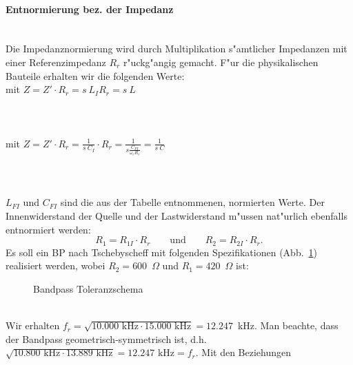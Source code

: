 \paragraph{Entnormierung bez. der Impedanz}~\\
Die Impedanznormierung wird durch Multiplikation s"amtlicher Impedanzen mit
einer Referenzimpedanz $R_r$ r"uckg"angig gemacht.
F"ur die physikalischen Bauteile erhalten wir die folgenden Werte:\\
\nit mit  $ Z=Z' \cdot R_r=s~ L_I R_r=s~ L $\\~~\\
\\~~\\
\nit mit $ Z=Z' \cdot R_r=\displaystyle\frac{1}{s~C_I} \cdot R_r  =
\displaystyle\frac{1}{s \displaystyle\frac{C_{FI}}{\omega_r R_r}}=
\displaystyle\frac{1}{s~C} $\\~~\\
\\~~\\ 
$L_{FI}$ und $C_{FI}$ sind die aus der Tabelle entnommenen,
normierten Werte.  Der Innenwiderstand der
Quelle und der Lastwiderstand
m"ussen nat"urlich ebenfalls entnormiert werden:
\begin{equation*}
R_1=R_{1I} \cdot R_r\qquad\text{und}\qquad R_2=R_{2I} \cdot R_r.
\end{equation*}
\bsp{}
Es soll ein BP nach Tschebyscheff mit folgenden Spezifikationen (Abb.~\ref{FIL_BP_BSP}) realisiert
werden, wobei $R_2=600$~$\Omega$ und $R_1=420$~$\Omega$ ist:
\begin{figure}[!htb]
\vspace*{-3mm}
\begin{center}
  \caption{Bandpass Toleranzschema}\label{FIL_BP_BSP}
\end{center}
\vspace*{-6mm}
\end{figure}\\
\nit Wir erhalten $f_r=\sqrt{10.000\mbox{~kHz}\cdot
  15.000\mbox{~kHz}}=12.247$~kHz. Man beachte, dass der Bandpass
geometrisch-symmetrisch ist, d.h. $\sqrt{10.800\mbox{~kHz}\cdot
  13.889\mbox{~kHz}}=12.247\mbox{~kHz}=f_r$. Mit den Beziehungen
